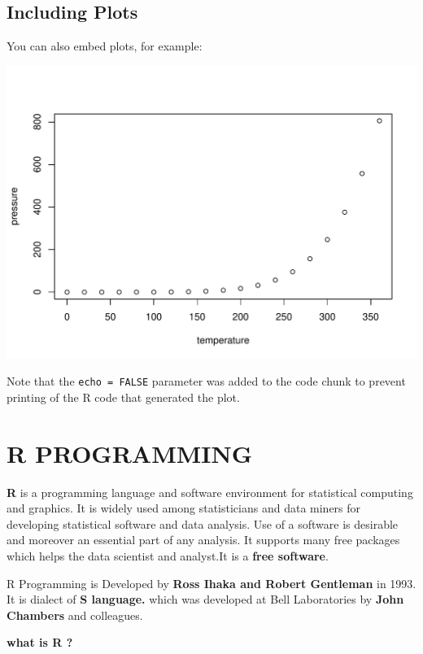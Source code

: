 \documentclass[
]{article}
\begin{document}
\subsection{Including Plots}\label{including-plots}

You can also embed plots, for example:

\includegraphics{Guideline-Book_files/figure-latex/pressure-1.pdf}

Note that the \texttt{echo\ =\ FALSE} parameter was added to the code
chunk to prevent printing of the R code that generated the plot.

\newpage

\section{R PROGRAMMING}\label{r-programming}

\textbf{R} is a programming language and software environment for
statistical computing and graphics. It is widely used among
statisticians and data miners for developing statistical software and
data analysis. Use of a software is desirable and moreover an essential
part of any analysis. It supports many free packages which helps the
data scientist and analyst.It is a \textbf{free software}.

R Programming is Developed by \textbf{Ross Ihaka and Robert Gentleman}
in 1993. It is dialect of \textbf{S language.} which was developed at
Bell Laboratories by \textbf{John Chambers} and colleagues.

\textbf{what is R ?}
\end{document}
